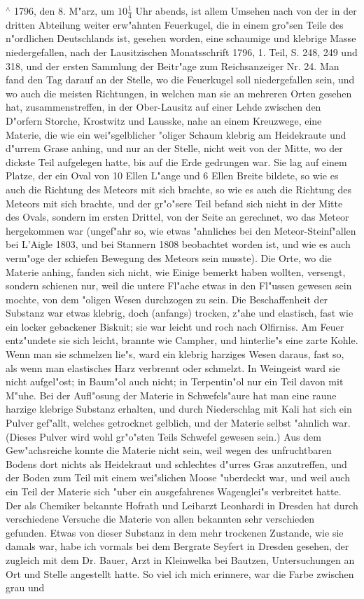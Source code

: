 \documentclass[a4paper, 11pt, oneside, polutonikogreek, german]{article}
\begin{document}
$^\wedge$ 1796, den 8. M"arz, um $\mathfrak{10\frac{1}{4}}$ Uhr abends, ist allem Umsehen nach von der in der dritten Abteilung weiter erw"ahnten Feuerkugel, die in einem gro"sen Teile des n"ordlichen Deutschlands ist, gesehen worden, eine schaumige und klebrige Masse niedergefallen, nach der Lausitzischen Monatsschrift 1796, 1. Teil, S. 248, 249 und 318, und der ersten Sammlung der Beitr"age zum Reichsanzeiger Nr. 24. Man fand den Tag darauf an der Stelle, wo die Feuerkugel soll niedergefallen sein, und wo auch die meisten Richtungen, in welchen man sie an mehreren Orten gesehen hat, zusammenstreffen, in der Ober-Lausitz auf einer Lehde zwischen den D"orfern Storche, Krostwitz und Lausske, nahe an einem Kreuzwege, eine Materie, die wie ein wei"sgelblicher "oliger Schaum klebrig am Heidekraute und d"urrem Grase anhing, und nur an der Stelle, nicht weit von der Mitte, wo der dickste Teil aufgelegen hatte, bis auf die Erde gedrungen war. Sie lag auf einem Platze, der ein Oval von 10 Ellen L"ange und 6 Ellen Breite bildete, so wie es auch die Richtung des Meteors mit sich brachte, so wie es auch die Richtung des Meteors mit sich brachte, und der gr"o"sere Teil befand sich nicht in der Mitte des Ovals, sondern im ersten Drittel, von der Seite an gerechnet, wo das Meteor hergekommen war (ungef"ahr so, wie etwas "ahnliches bei den Meteor-Steinf"allen bei L'Aigle 1803, und bei Stannern 1808 beobachtet worden ist, und wie es auch verm"oge der schiefen Bewegung des Meteors sein musste). Die Orte, wo die Materie anhing, fanden sich nicht, wie Einige bemerkt haben wollten, versengt, sondern schienen nur, weil die untere Fl"ache etwas in den Fl"ussen gewesen sein mochte, von dem "oligen Wesen durchzogen zu sein. Die Beschaffenheit der Substanz war etwas klebrig, doch (anfangs) trocken, z"ahe und elastisch, fast wie ein locker gebackener Biskuit; sie war leicht und roch nach Olfirniss. Am Feuer entz"undete sie sich leicht, brannte wie Campher, und hinterlie"s eine zarte Kohle. Wenn man sie schmelzen lie"s, ward ein klebrig harziges Wesen daraus, fast so, als wenn man elastisches Harz verbrennt oder schmelzt. In Weingeist ward sie nicht aufgel"ost; in Baum"ol auch nicht; in Terpentin"ol nur ein Teil davon mit M"uhe. Bei der Aufl"osung der Materie in Schwefels"aure hat man eine raune harzige klebrige Substanz erhalten, und durch Niederschlag mit Kali hat sich ein Pulver gef"allt, welches getrocknet gelblich, und der Materie selbst "ahnlich war. (Dieses Pulver wird wohl gr"o"sten Teils Schwefel gewesen sein.) Aus dem Gew"achsreiche konnte die Materie nicht sein, weil wegen des unfruchtbaren Bodens dort nichts als Heidekraut und schlechtes d"urres Gras anzutreffen, und der Boden zum Teil mit einem wei"slichen Moose "uberdeckt war, und weil auch ein Teil der Materie sich "uber ein ausgefahrenes Wagenglei"s verbreitet hatte. Der als Chemiker bekannte Hofrath und Leibarzt Leonhardi in Dresden hat durch verschiedene Versuche die Materie von allen bekannten sehr verschieden gefunden. Etwas von dieser Substanz in dem mehr trockenen Zustande, wie sie damals war, habe ich vormals bei dem Bergrate Seyfert in Dresden gesehen, der zugleich mit dem Dr. Bauer, Arzt in Kleinwelka bei Bautzen, Untersuchungen an Ort und Stelle angestellt hatte. So viel ich mich erinnere, war die Farbe zwischen grau und 
\end{document}
